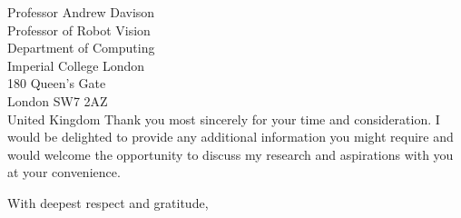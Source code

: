 \documentclass[12pt,a4paper]{letter}
\begin{document}
\begin{letter}{Professor Andrew Davison\\Professor of Robot Vision\\Department of Computing\\Imperial College London\\180 Queen's Gate\\London SW7 2AZ\\United Kingdom}
Thank you most sincerely for your time and consideration. I would be delighted to provide any additional information you might require and would welcome the opportunity to discuss my research and aspirations with you at your convenience.

\closing{With deepest respect and gratitude,}

\signature{Deborah Akuoko}


\end{letter}
\end{document}
